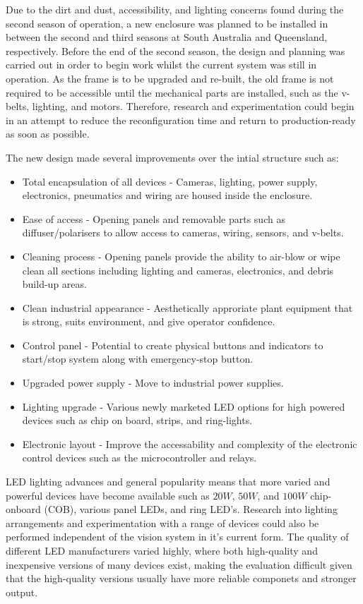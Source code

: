 \documentclass[fleqn,twoside,12pt]{report}
\begin{document}
Due to the dirt and dust, accessibility, and lighting concerns found during the second season of operation, a new enclosure was planned to be installed in between the second and third seasons at South Australia and Queensland, respectively. Before the end of the second season, the design and planning was carried out in order to begin work whilst the current system was still in operation. As the frame is to be upgraded and re-built, the old frame is not required to be accessible until the mechanical parts are installed, such as the v-belts, lighting, and motors. Therefore, research and experimentation could begin in an attempt to reduce the reconfiguration time and return to production-ready as soon as possible.

The new design made several improvements over the intial structure such as:

\begin{itemize}
	\item Total encapsulation of all devices - Cameras, lighting, power supply, electronics, pneumatics and wiring are housed inside the enclosure.
	\item Ease of access - Opening panels and removable parts such as diffuser/polarisers to allow access to cameras, wiring, sensors, and v-belts.
	\item Cleaning process - Opening panels provide the ability to air-blow or wipe clean all sections including lighting and cameras, electronics, and debris build-up areas.
	\item Clean industrial appearance - Aesthetically approriate plant equipment that is strong, suits environment, and give operator confidence.
	\item Control panel - Potential to create physical buttons and indicators to start/stop system along with emergency-stop button.
	\item Upgraded power supply - Move to industrial power supplies.
	\item Lighting upgrade - Various newly marketed LED options for high powered devices such as chip on board, strips, and ring-lights.
	\item Electronic layout - Improve the accessability and complexity of the electronic control devices such as the microcontroller and relays.
\end{itemize}
  
LED lighting advances and general popularity means that more varied and powerful devices have become available such as $20W$, $50W$, and $100W$ chip-onboard (COB), various panel LEDs, and ring LED's. Research into lighting arrangements and experimentation with a range of devices could also be performed independent of the vision system in it's current form. The quality of different LED manufacturers varied highly, where both high-quality and inexpensive versions of many devices exist, making the evaluation difficult given that the high-quality versions usually have more reliable componets and stronger output. 
\end{document}
